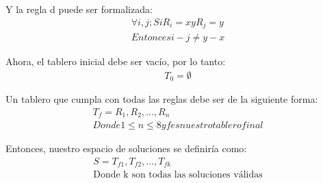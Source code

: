 \documentclass[letter, 10pt]{article}
\begin{document}
Y la regla d puede ser formalizada:
\begin{align*}
    \forall i, j; Si R_{i} = x y R_{j} = y \\
    Entonces i - j \neq y - x
\end{align*}

Ahora, el tablero inicial debe ser vacío, por lo tanto:
\begin{align*}
    T_{0} = \emptyset
\end{align*}

Un tablero que cumpla con todas las reglas debe ser de la siguiente forma:
\begin{align*}
    T_{f} = {R_{1}, R_{2},\ldots, R_{n}} \\
    Donde 1 \leq n \leq 8 y f es nuestro tablero final
\end{align*}

Entonces, nuestro espacio de soluciones se definiría como:
\begin{align*}
    S = {T_{f1}, T_{f2},\ldots, T_{fk}}\\
    \text{Donde k son todas las soluciones válidas}
\end{align*}
\end{document}
